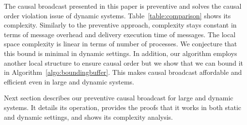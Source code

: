 The causal broadcast presented in this paper is preventive and solves the causal
order violation issue of dynamic systems.  Table~\ref{table:comparison} shows
its complexity. Similarly to the preventive approach, complexity stays constant
in terms of message overhead and delivery execution time of messages. The local
space complexity is linear in terms of number of processes. We conjecture that
this bound is minimal in dynamic settings. In addition, our algorithm employs
another local structure to ensure causal order but we show that we can bound it
in Algorithm~\ref{algo:boundingbuffer}. This makes causal broadcast affordable
and efficient even in large and dynamic systems.

Next section describes our preventive causal broadcast for large and dynamic
systems. It details its operation, provides the proofs that it works in both
static and dynamic settings, and shows its complexity analysis.

